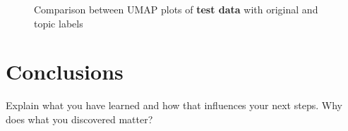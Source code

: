 \documentclass[a4paper]{article}
\begin{document}
\begin{figure}[H]
  \centering
  \caption{Comparison between UMAP plots of \textbf{test data} with original and topic labels}
  \label{umap_test_plots}
\end{figure}

\section{Conclusions}
Explain what you have learned and how that influences your next steps. Why does what you discovered matter?
\end{document}
